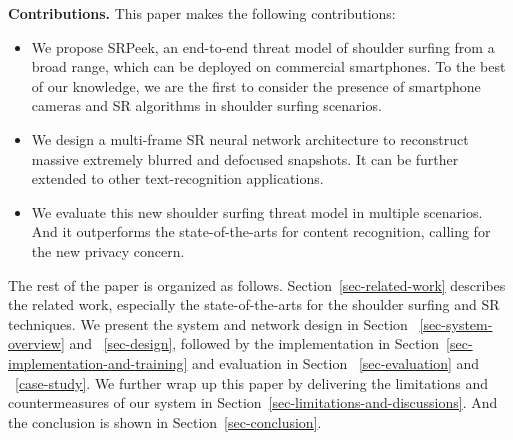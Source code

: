 \vspace{1mm}
\noindent
\textbf{Contributions.} This paper makes the following contributions:
\begin{itemize}
  \item	We propose \textsf{SRPeek}, an end-to-end threat model of shoulder surfing from a broad range, which can be deployed on commercial smartphones. To the best of our knowledge, we are the first to consider the presence of smartphone cameras and SR algorithms in shoulder surfing scenarios.
  \item	We design a multi-frame SR neural network architecture to reconstruct massive extremely blurred and defocused snapshots. It can be further extended to other text-recognition applications.
  \item	We evaluate this new shoulder surfing threat model in multiple scenarios. And it outperforms the state-of-the-arts for content recognition, calling for the new privacy concern.
\end{itemize}

\vspace{1mm}
The rest of the paper is organized as follows. Section~\ref{sec-related-work} describes the related work, especially the state-of-the-arts for the shoulder surfing and SR techniques. We present the system and network design in Section ~\ref{sec-system-overview} and ~\ref{sec-design}, followed by the implementation in Section~\ref{sec-implementation-and-training} and evaluation in Section ~\ref{sec-evaluation} and ~\ref{case-study}. We further wrap up this paper by delivering the limitations and countermeasures of our system in Section~\ref{sec-limitations-and-discussions}. And the conclusion is shown in Section~\ref{sec-conclusion}.
